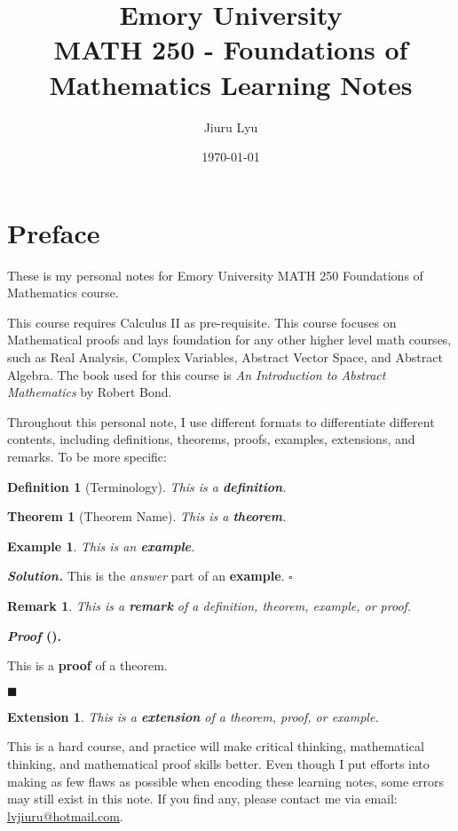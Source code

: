 \documentclass[12pt,a4paper]{article}
\title{Emory University\\\textbf{MATH 250 - Foundations of Mathematics Learning Notes}}
\author{Jiuru Lyu}
\date{\today}
\newtheorem{thm}{Theorem}[subsection]
\newtheorem{df}{Definition}[subsection]
\newtheorem{eg}{Example}[subsection]
\newcounter{nprf}[subsection]
\newenvironment*{sol}{\par\indent\textbf{\textit{Solution. }}}{\hfill{$\square$}\par}
\newtheorem*{rmk}{\indent Remark}
\newenvironment*{prf}{\par\indent\textbf{\textit{Proof} (\stepcounter{nprf}\thenprf). }\par}{\par\hfill $\blacksquare$\par}
\newtheorem*{ext}{\indent Extension}
\begin{document}
\maketitle
\tableofcontents
\newpage

\section*{Preface}
These is my personal notes for Emory University MATH 250 Foundations of Mathematics course. 

This course requires Calculus II as pre-requisite. This course focuses on Mathematical proofs and lays foundation for any other higher level math courses, such as Real Analysis, Complex Variables, Abstract Vector Space, and Abstract Algebra. The book used for this course is \textit{An Introduction to Abstract Mathematics} by Robert Bond. 

Throughout this personal note, I use different formats to differentiate different contents, including definitions, theorems, proofs, examples, extensions, and remarks. To be more specific: 
\begin{df}[Terminology]
    This is a \textbf{definition}.	
\end{df}
\begin{thm}[Theorem Name]
    This is a \textbf{theorem}.	
\end{thm}
\begin{eg}
    This is  an \textbf{example}. 
\end{eg}

\begin{sol}
    This is the \textit{answer} part of an \textbf{example}. 
\end{sol}
\begin{rmk}
	This is a \textbf{remark} of a definition, theorem, example, or proof. 
\end{rmk}

\begin{prf}
	This is a \textbf{proof} of a theorem. 
\end{prf}
\begin{ext}
	This is a \textbf{extension} of a theorem, proof, or example. 	
\end{ext}
This is a hard course, and practice will make critical thinking, mathematical thinking, and mathematical proof skills better. Even though I put efforts into making as few flaws as possible when encoding these learning notes, some errors may still exist in this note. If you find any, please contact me via email: \url{lvjiuru@hotmail.com}. 
\end{document}
